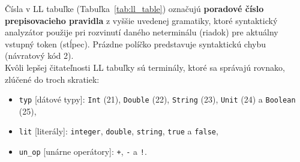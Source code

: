 Čísla v LL tabuľke (Tabuľka~\ref{tab:ll_table}) označujú \textbf{poradové číslo prepisovacieho pravidla} z vyššie uvedenej gramatiky, ktoré syntaktický analyzátor použije pri rozvinutí daného neterminálu (riadok) pre aktuálny vstupný token (stĺpec). Prázdne políčko predstavuje syntaktickú chybu (návratový kód {2}).
\bigskip
\\
Kvôli lepšej čitateľnosti LL tabuľky sú terminály, ktoré sa správajú rovnako, zlúčené do troch skratiek:
\begin{itemize}
    \item \texttt{typ} [dátové typy]: \texttt{Int} (21), \texttt{Double} (22), \texttt{String} (23), \texttt{Unit} (24) a \texttt{Boolean} (25),
    \item \texttt{lit} [literály]: \texttt{integer}, \texttt{double}, \texttt{string}, \texttt{true} a \texttt{false},
    \item \texttt{un\_op} [unárne operátory]: \texttt{+}, \texttt{-} a \texttt{!}.
\end{itemize}

